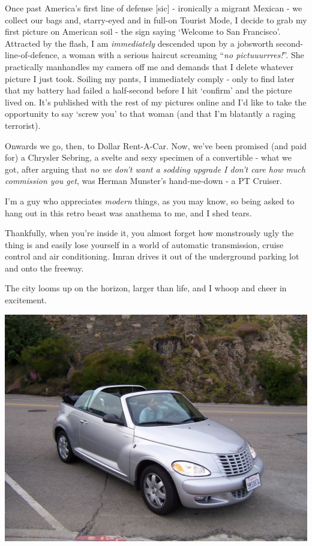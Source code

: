 \documentclass[a5paper,titlepage,11pt]{book}
\begin{document}
Once past America's first line of defense [sic] - ironically a migrant Mexican - we collect our bags and, starry-eyed and in full-on Tourist Mode, I decide to grab my first picture on American soil - the sign saying `Welcome to San Francisco'.  Attracted by the flash, I am \emph{immediately} descended upon by a jobsworth second-line-of-defence, a woman with a serious haircut screaming ``\emph{no pictuuurrres!}''.  She practically manhandles my camera off me and demands that I delete whatever picture I just took. Soiling my pants, I immediately comply - only to find later that my battery had failed a half-second before I hit `confirm' and the picture lived on.  It's published with the rest of my pictures online and I'd like to take the opportunity to say `screw you' to that woman (and that I'm blatantly a raging terrorist).

Onwards we go, then, to Dollar Rent-A-Car.  Now, we've been promised (and paid for) a Chrysler Sebring, a svelte and sexy specimen of a convertible - what we got, after arguing that \emph{no we don't want a sodding upgrade I don't care how much commission you get}, was Herman Munster's hand-me-down - a PT Cruiser.

I'm a guy who appreciates \emph{modern} things, as you may know, so being asked to hang out in this retro beast was anathema to me, and I shed tears.

Thankfully, when you're inside it, you almost forget how monstrously ugly the thing is and easily lose yourself in a world of automatic transmission, cruise control and air conditioning.  Imran drives it out of the underground parking lot and onto the freeway.

The city looms up on the horizon, larger than life, and I whoop and cheer in excitement.

\begin{center}\includegraphics[width=\textwidth]{gfx/100_1064}\end{center}
\end{document}
